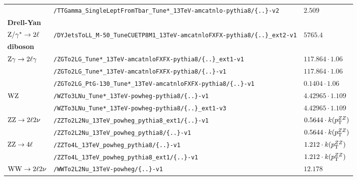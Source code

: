 \begin{table}[tb]
\begin{tabular}[width=\textwidth]{lll}
                                                   & \verb|/TTGamma_SingleLeptFromTbar_Tune*_13TeV-amcatnlo-pythia8/{..}-v2| & $2.509$                                   \\
  \textbf{Drell-Yan}                               &                         &                                           \\
  $\mathrm{Z}/\gamma^{*}\to2\ell$                           & \verb|/DYJetsToLL_M-50_TuneCUETP8M1_13TeV-amcatnloFXFX-pythia8/{..}_ext2-v1| & $5765.4$                                  \\
  \textbf{diboson}                                 &                         &                                           \\
  $\mathrm{Z}\gamma\to2\ell\gamma$                            & \verb|/ZGTo2LG_Tune*_13TeV-amcatnloFXFX-pythia8/{..}_ext1-v1| & $117.864\cdot1.06$                        \\
                                                   & \verb|/ZGTo2LG_Tune*_13TeV-amcatnloFXFX-pythia8/{..}-v1| & $117.864\cdot1.06$                        \\
                                                   & \verb|/ZGTo2LG_PtG-130_Tune*_13TeV-amcatnloFXFX-pythia8/{..}-v1| & $0.1404\cdot1.06$                         \\
  $\mathrm{W}\mathrm{Z}$                                         & \verb|/WZTo3LNu_Tune*_13TeV-powheg-pythia8/{..}-v1| & $4.42965\cdot1.109$                       \\
                                                   & \verb|/WZTo3LNu_Tune*_13TeV-powheg-pythia8/{..}_ext1-v3| & $4.42965\cdot1.109$                       \\
  $\mathrm{Z}\mathrm{Z}\to2\ell2\nu$                            & \verb|/ZZTo2L2Nu_13TeV_powheg_pythia8_ext1/{..}-v1| & $0.5644\cdot k(p_{\mathrm{T}}^{ZZ})$                 \\
                                                   & \verb|/ZZTo2L2Nu_13TeV_powheg_pythia8/{..}-v1| & $0.5644\cdot k(p_{\mathrm{T}}^{ZZ})$                 \\
  $\mathrm{Z}\mathrm{Z}\to4\ell$                                 & \verb|/ZZTo4L_13TeV_powheg_pythia8/{..}-v1| & $1.212\cdot k(p_{\mathrm{T}}^{ZZ})$                  \\
                                                   & \verb|/ZZTo4L_13TeV_powheg_pythia8_ext1/{..}-v1| & $1.212\cdot k(p_{\mathrm{T}}^{ZZ})$                  \\
  $\mathrm{W}\mathrm{W}\to2\ell2\nu$                            & \verb|/WWTo2L2Nu_13TeV-powheg/{..}-v1| & $12.178$                                  \\

\end{tabular}
\end{table}
